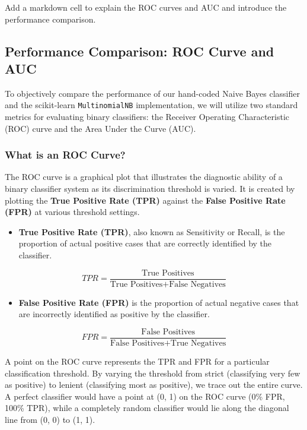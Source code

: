 \documentclass[12pt,a4paper]{article}
\begin{document}
Add a markdown cell to explain the ROC curves and AUC and introduce the performance comparison.



\subsection{Performance Comparison: ROC Curve and AUC}

To objectively compare the performance of our hand-coded Naive Bayes classifier and the scikit-learn \texttt{MultinomialNB} implementation, we will utilize two standard metrics for evaluating binary classifiers: the Receiver Operating Characteristic (ROC) curve and the Area Under the Curve (AUC).

\subsubsection{What is an ROC Curve?}

The ROC curve is a graphical plot that illustrates the diagnostic ability of a binary classifier system as its discrimination threshold is varied. It is created by plotting the \textbf{True Positive Rate (TPR)} against the \textbf{False Positive Rate (FPR)} at various threshold settings.

\begin{itemize}
    \item \textbf{True Positive Rate (TPR)}, also known as Sensitivity or Recall, is the proportion of actual positive cases that are correctly identified by the classifier.
\end{itemize}

    \[TPR = \frac{\text{True Positives}}{\text{True Positives} + \text{False Negatives}}\]
\begin{itemize}
    \item \textbf{False Positive Rate (FPR)} is the proportion of actual negative cases that are incorrectly identified as positive by the classifier.
\end{itemize}

    \[FPR = \frac{\text{False Positives}}{\text{False Positives} + \text{True Negatives}}\]

A point on the ROC curve represents the TPR and FPR for a particular classification threshold. By varying the threshold from strict (classifying very few as positive) to lenient (classifying most as positive), we trace out the entire curve. A perfect classifier would have a point at (0, 1) on the ROC curve (0\% FPR, 100\% TPR), while a completely random classifier would lie along the diagonal line from (0, 0) to (1, 1).
\end{document}
